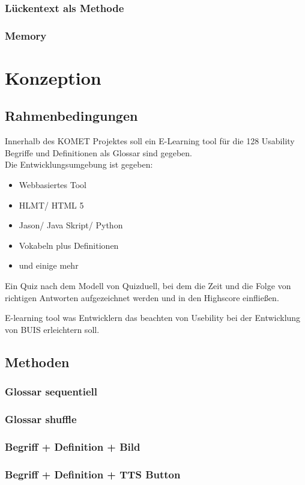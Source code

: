 \documentclass[a4paper, 12pt, twoside, BCOR=20mm, DIV=calc, abstracton, parskip=half*, toc=bibliography, toc=listof, headsepline, headings=small, numbers=enddot]{scrreprt} %
\begin{document}
\subsection{Lückentext als Methode}
\subsection{Memory }

\chapter{Konzeption}
\section{Rahmenbedingungen}
Innerhalb des KOMET Projektes soll ein E-Learning tool für die 128 Usability Begriffe und Definitionen als Glossar sind gegeben. \\Die Entwicklungsumgebung ist gegeben:
\begin{itemize}
\item{Webbasiertes Tool}
\item{HLMT/ HTML 5}
\item{Jason/ Java Skript/ Python}
\item{Vokabeln plus Definitionen}
\item und einige mehr  
\end{itemize}

Ein Quiz nach dem Modell von Quizduell, bei dem die Zeit und die Folge von richtigen Antworten aufgezeichnet werden und in den Highscore einfließen.

E-learning tool was Entwicklern das beachten von Usebility bei der Entwicklung von BUIS erleichtern soll.  

\section{Methoden}
\subsection{Glossar sequentiell}
\subsection{Glossar shuffle}
\subsection{Begriff + Definition + Bild}
\subsection{Begriff + Definition + TTS Button}
\end{document}
